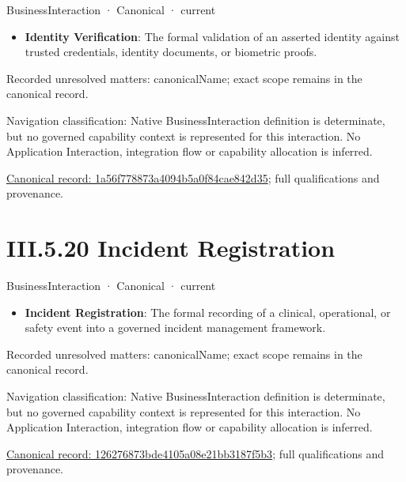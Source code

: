 \label{element:1a56f778873a4094b5a0f84cae842d35}
{\small BusinessInteraction · Canonical · current}\par

\begin{itemize}


\item \textbf{Identity Verification}: The formal validation of an asserted identity against trusted credentials, identity documents, or biometric proofs.

\end{itemize}

{\small Recorded unresolved matters: canonicalName; exact scope remains in the canonical record.}\par
{\small Navigation classification: Native BusinessInteraction definition is determinate, but no governed capability context is represented for this interaction. No Application Interaction, integration flow or capability allocation is inferred.}\par
{\footnotesize \href{../../../../continuum/business/business-interaction/1a56f778873a4094b5a0f84cae842d35.md}{Canonical record: 1a56f778873a4094b5a0f84cae842d35}; full qualifications and provenance.}\par
\section*{III.5.20 Incident Registration}
\label{navigation:III.5.20}

\label{element:126276873bde4105a08e21bb3187f5b3}
{\small BusinessInteraction · Canonical · current}\par

\begin{itemize}


\item \textbf{Incident Registration}: The formal recording of a clinical, operational, or safety event into a governed incident management framework.

\end{itemize}

{\small Recorded unresolved matters: canonicalName; exact scope remains in the canonical record.}\par
{\small Navigation classification: Native BusinessInteraction definition is determinate, but no governed capability context is represented for this interaction. No Application Interaction, integration flow or capability allocation is inferred.}\par
{\footnotesize \href{../../../../continuum/business/business-interaction/126276873bde4105a08e21bb3187f5b3.md}{Canonical record: 126276873bde4105a08e21bb3187f5b3}; full qualifications and provenance.}\par
